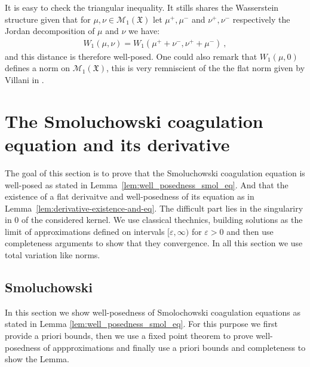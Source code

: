 \documentclass[11pt,a4paper]{article}
\newcommand{\MC}{\mathcal{M}}
\newcommand{\XF}{\mathfrak{X}}
\begin{document}
It is easy to check the triangular inequality. It stills shares the Wasserstein structure given that for $\mu,\nu \in \MC_{1}(\XF)$ let $\mu^+,\mu^-$ and $\nu^+,\nu^-$ respectively the Jordan decomposition of $\mu$ and $\nu$ we have:
\begin{align*}
    W_{1}(\mu, \nu) = W_{1}(\mu^+ + \nu^-, \nu^+ + \mu^-)\ ,
\end{align*}
and this distance is therefore well-posed. One could also remark that $W_{1}(\mu,0)$ defines a norm on $\MC_{1}(\XF)$, this is very remniscient of the the flat norm given by Villani in \cite{villani2008optimal}.


\section{The Smoluchowski coagulation equation and its derivative}\label{section:well-posedness-SCE}

The goal of this section is to prove that the Smoluchowski coagulation equation is well-posed as stated in Lemma~\ref{lem:well_posedness_smol_eq}. And that the existence of a flat derivaitve and well-posedness of its equation as in Lemma~\ref{lem:derivative-existence-and-eq}. The difficult part lies in the singulariry in $0$ of the considered kernel. We use classical thechnics, building solutions as the limit of approximations defined on intervals $[\varepsilon,\infty)$ for $\varepsilon > 0$ and then use completeness arguments to show that they convergence. In all this section we use total variation like norms.

\subsection{Smoluchowski}
In this section we show well-posedness of Smolochowski coagulation equations as stated in Lemma \ref{lem:well_posedness_smol_eq}. For this purpose we first provide a priori bounds, then we use a fixed point theorem to prove well-posedness of appproximations and finally use a priori bounds and completeness to show the Lemma.
\end{document}
